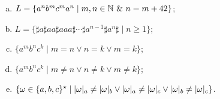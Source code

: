 \begin{extra}
\begin{problem}
\begin{enumerate}[a)]
  \item
    $L = \{a^nb^mc^ma^n \mid m,n\in\Nat\ \&\ n = m+42\}$;
  \item
    $L = \{\sharp a \sharp aa \sharp aaa \sharp \cdots \sharp a^{n-1}\sharp a^n\sharp \mid n \geq 1\}$;
  \item
    $\{a^mb^nc^k\mid m = n \vee n = k \vee m = k\}$;
  \item
    $\{a^mb^nc^k\mid m \neq n \vee n \neq k \vee m \neq k\}$;
  \item
    $\{\omega \in \{a,b,c\}^\star\mid \vert{\omega}\vert_{a} \neq \vert{\omega}\vert_{b} \vee \vert{\omega}\vert_{a} \neq \vert{\omega}\vert_{c} \vee \vert{\omega}\vert_{b} \neq \vert{\omega}\vert_{c}\}$.
  \end{enumerate}
\end{problem}

\end{extra}

